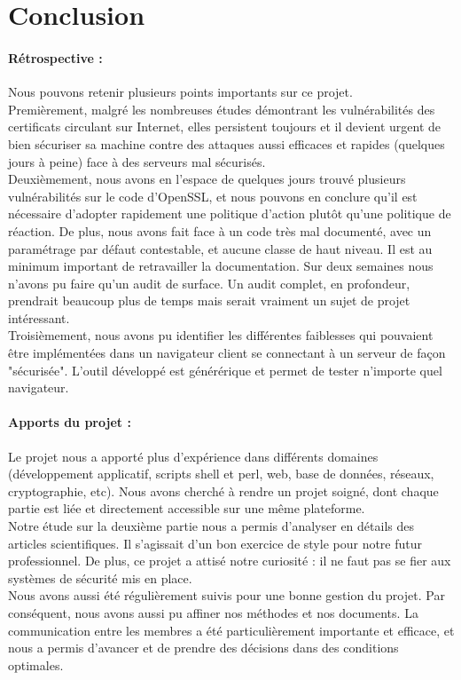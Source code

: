 \section*{Conclusion}

\paragraph{Rétrospective :\\}
Nous pouvons retenir plusieurs points importants sur ce projet.\\
Premièrement, malgré les nombreuses études démontrant les vulnérabilités des certificats circulant sur Internet, elles persistent toujours et il devient urgent de bien sécuriser sa machine contre des attaques aussi efficaces et rapides (quelques jours à peine) face à des serveurs mal sécurisés.\\

Deuxièmement, nous avons en l'espace de quelques jours trouvé plusieurs vulnérabilités sur le code d'OpenSSL, et nous pouvons en conclure qu'il est nécessaire d'adopter rapidement une politique d'action plutôt qu'une politique de réaction. De plus, nous avons fait face à un code très mal documenté, avec un paramétrage par défaut contestable, et aucune classe de haut niveau. Il est au minimum important de retravailler la documentation. Sur deux semaines nous n'avons pu faire qu'un audit de surface. Un audit complet, en profondeur, prendrait beaucoup plus de temps mais serait vraiment un sujet de projet intéressant.\\

Troisièmement, nous avons pu identifier les différentes faiblesses qui pouvaient être implémentées dans un navigateur client se connectant à un serveur de façon "sécurisée". L'outil développé est générérique et permet de tester n'importe quel navigateur.


\paragraph{Apports du projet :\\}
Le projet nous a apporté plus d'expérience dans différents domaines (développement applicatif, scripts shell et perl, web, base de données, réseaux, cryptographie, etc). Nous avons cherché à rendre un projet soigné, dont chaque partie est liée et directement accessible sur une même plateforme.\\
Notre étude sur la deuxième partie nous a permis d'analyser en détails des articles scientifiques. Il s'agissait d'un bon exercice de style pour notre futur professionnel. De plus, ce projet a attisé notre curiosité : il ne faut pas se fier aux systèmes de sécurité mis en place.\\
Nous avons aussi été régulièrement suivis pour une bonne gestion du projet. Par conséquent, nous avons aussi pu affiner nos méthodes et nos documents. La communication entre les membres a été particulièrement importante et efficace, et nous a permis d'avancer et de prendre des décisions dans des conditions optimales. 

